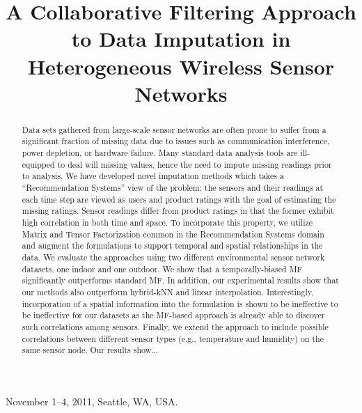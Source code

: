 \documentclass[10pt]{sigplan-proc-varsize-sensys11}
\begin{document}
\title{A Collaborative Filtering Approach to Data Imputation in Heterogeneous Wireless Sensor Networks}
\author{
}

 {November 1--4, 2011, Seattle, WA, USA.}

\maketitle

\begin{abstract}
Data sets gathered from large-scale sensor networks are often prone to suffer from a significant fraction of missing data due to issues such as communication interference, power depletion, or hardware failure. 
Many standard data analysis tools are ill-equipped to deal will missing values, hence the need to impute missing readings prior to analysis.
We have developed novel imputation methods which takes a ``Recommendation Systems'' view of the problem: the sensors and their readings at each time step are viewed as users and product ratings with the goal of estimating the missing ratings.
Sensor readings differ from product ratings in that the former exhibit high correlation in both time and space.
To incorporate this property, we utilize Matrix and Tensor Factorization common in the Recommendation Systems domain and augment the formulations to support temporal and spatial relationships in the data.
We evaluate the approaches using two different environmental sensor network datasets, one indoor and one outdoor.
We show that a temporally-biased MF significantly outperforms standard MF.
In addition, our experimental results show that our methods also outperform hybrid-kNN and linear interpolation.
Interestingly, incorporation of a spatial information into the formulation is shown to be ineffective to be ineffective for our datasets as the MF-based approach is already able to discover such correlations among sensors.
Finally, we extend the approach to include possible correlations between different sensor types (e.g., temperature and humidity) on the same sensor node.
Our results show...
\end{abstract}
\end{document}
